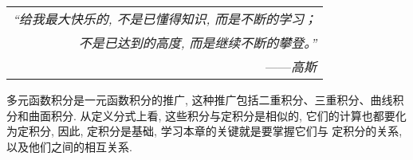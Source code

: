 \begin{flushright}
    \begin{tabular}{r|}
        \textit{“给我最大快乐的, 不是已懂得知识, 而是不断的学习；}\\
        \textit{不是已达到的高度, 而是继续不断的攀登。”}\\
        ——\textit{高斯}
    \end{tabular}
\end{flushright}

多元函数积分是一元函数积分的推广, 这种推广包括二重积分、三重积分、曲线积分和曲面积分.
从定义分式上看, 这些积分与定积分是相似的, 它们的计算也都要化为定积分, 因此, 定积分是基础, 学习本章的关键就是要掌握它们与
定积分的关系, 以及他们之间的相互关系.